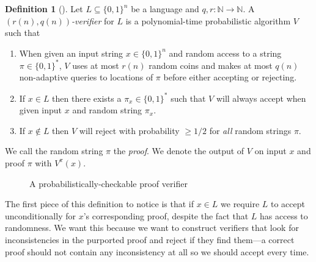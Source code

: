 \documentclass[english,12pt]{reedthesis}
\theoremstyle{plain}
\theoremstyle{definition}
\newtheorem{defn}[defn]{Definition}
\theoremstyle{remark}
\begin{document}
\begin{defn}[{\cite[Def.\ 18.1]{AB09}}]\label{def:prob-check}
  Let $L \subseteq \{0, 1\}^{n}$ be a language and $q, r\colon \mathbb{N} \rightarrow \mathbb{N}$. A
  \emph{$(r(n), q(n))$-verifier} for $L$ is a polynomial-time probabilistic
  algorithm $V$ such that
  \begin{enumerate}
    \item When given an input string $x \in \{0, 1\}^{n}$ and random access to a
          string $\pi \in \{0, 1\}^{*}$, $V$ uses at most $r(n)$ random coins and
          makes at most $q(n)$ non-adaptive queries to locations of $\pi$ before
          either accepting or rejecting.
    \item If $x \in L$ then there exists a $\pi_{x} \in \{0, 1\}^{*}$ such that $V$
          will always accept when given input $x$ and random string $\pi_{x}$.
    \item If $x \notin L$ then $V$ will reject with probability $\ge 1/2$ for
          \emph{all} random strings $\pi$.
  \end{enumerate}
  We call the random string $\pi$ the \emph{proof}. We denote the output of $V$ on
  input $x$ and proof $\pi$ with $V^{\pi}(x)$.
\end{defn}

\begin{figure}
  \centering
  \caption{A probabilistically-checkable proof verifier}\label{fig:pcp}
\end{figure}

The first piece of this definition to notice is that if $x \in L$ we require $L$
to accept unconditionally for $x$'s corresponding proof, despite the fact that
$L$ has access to randomness. We want this because we want to construct
verifiers that look for inconsistencies in the purported proof and reject if
they find them---a correct proof should not contain any inconsistency at all so we
should accept every time.
\end{document}
